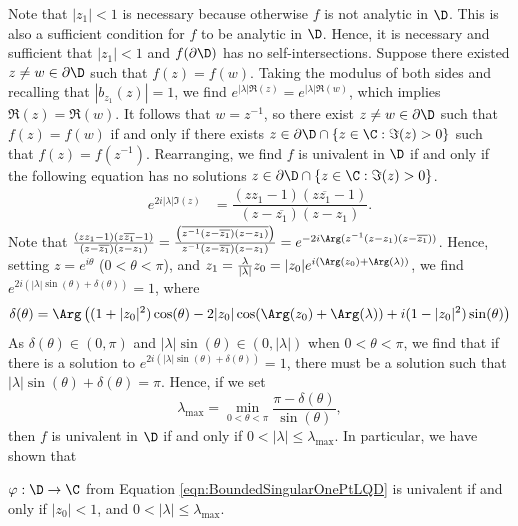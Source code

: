 \documentclass{article}
\numberwithin{equation}{section}
\begin{document}
Note that $|z_1|<1$ is necessary because otherwise $f$ is not analytic in $\D$. This is also a sufficient condition for $f$ to be analytic in $\D$. Hence, it is necessary and sufficient that $|z_1|<1$ and $f(\partial\D)$ has no self-intersections. Suppose there existed $z\neq w\in\partial\D$ such that $f(z)=f(w)$. Taking the modulus of both sides and recalling that $|b_{z_1}(z)|=1$, we find $e^{|\lambda|\Re(z)}=e^{|\lambda|\Re(w)}$, which implies $\Re(z)=\Re(w)$. It follows that $w=z^{-1}$, so there exist $z\neq w\in\partial\D$ such that $f(z)=f(w)$ if and only if there exists $z\in\partial\D\cap\{z\in\C:\Im(z)>0\}$ such that $f(z)=f(z^{-1})$. Rearranging, we find $f$ is univalent in $\D$ if and only if the following equation has no solutions $z\in\partial\D\cap\{z\in\C:\Im(z)>0\}$.
\begin{align*}
    e^{2i|\lambda|\Im(z)}&=\dfrac{(zz_1-1)(z\overline{z_1}-1)}{(z-\overline{z_1})(z-z_1)}.
\end{align*}
Note that $\frac{(zz_1-1)(z\overline{z_1}-1)}{(z-\overline{z_1})(z-z_1)}=\frac{\left(\overline{z^{-1}(z-\overline{z_1})(z-z_1)}\right)}{z^{-1}(z-\overline{z_1})(z-z_1)}=e^{-2i\Arg(z^{-1}(z-z_1)(z-\overline{z_1}))}$. Hence, setting $z=e^{i\theta}$ ($0<\theta<\pi$), and $z_1=\frac{\lambda}{|\lambda|}z_0=|z_0|e^{i(\Arg(z_0)+\Arg(\lambda))}$, we find $e^{2i(|\lambda|\sin(\theta)+\delta(\theta))}=1$, where
\begin{equation}\label{eqn:BoundedSingularOnePtLQDUnivalenceDelta}
\delta(\theta)=\Arg\left((1+|z_0|^2)\cos(\theta)-2|z_0|\cos(\Arg(z_0)+\Arg(\lambda))+i(1-|z_0|^2)\sin(\theta)\right)
\end{equation}
As $\delta(\theta)\in(0,\pi)$ and $|\lambda|\sin(\theta)\in(0,|\lambda|)$ when $0<\theta<\pi$, we find that if there is a solution to $e^{2i(|\lambda|\sin(\theta)+\delta(\theta))}=1$, there must be a solution such that $|\lambda|\sin(\theta)+\delta(\theta)=\pi$. Hence, if we set
\begin{equation}\label{eqn:BoundedSingularOnePtLQDUnivalenceMinimization}
\lambda_{\max}=\min_{0<\theta<\pi}\dfrac{\pi-\delta(\theta)}{\sin(\theta)},
\end{equation}
then $f$ is univalent in $\D$ if and only if $0<|\lambda|\leq\lambda_{\max}$. In particular, we have shown that

\begin{corollary}
$\varphi:\D\rightarrow\C$ from Equation \ref{eqn:BoundedSingularOnePtLQD} is univalent if and only if $|z_0|<1$, and $0<|\lambda|\leq\lambda_{\max}$.
\end{corollary}
\end{document}
